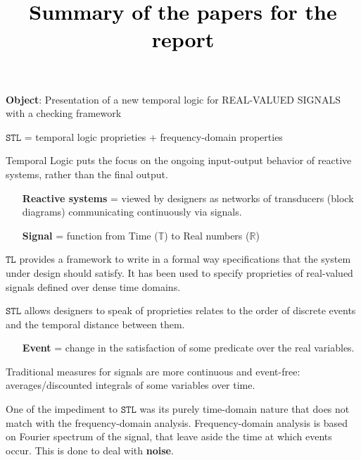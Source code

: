 \documentclass{suftesi}
\title{\textcolor{black}{Summary of the papers for the report}}
\author{}
\date{}
\renewcommand{\b}{\textbf}
\newcommand{\STL}{$\mathtt{STL}$ }
\newcommand{\TL}{$\mathtt{TL}$ }
\begin{document}
\maketitle

\tableofcontents
\newpage
\setcounter{page}{1}

\chapter{}

\b{Object}: Presentation of a new temporal logic for REAL-VALUED SIGNALS with a checking framework 

\STL = temporal logic proprieties + frequency-domain properties

Temporal Logic puts the focus on the ongoing input-output behavior of reactive systems, rather than the final output.

\begin{itemize}[leftmargin=3cm]
    \item [\b{Reactive systems} =] viewed by designers as networks of transducers (block diagrams) communicating continuously via signals.
\end{itemize}
\begin{itemize} [leftmargin=1.35cm]
    \item [\b{Signal} =] function from Time ($\mathbb{T}$) to Real numbers ($\mathbb{R}$)
\end{itemize}

\TL provides a framework to write in a formal way specifications that the system under design should satisfy. It has been used to specify proprieties of real-valued signals defined over dense time domains.

\STL allows designers to speak of proprieties relates to the order of discrete events and the temporal distance between them. 

\begin{itemize} [leftmargin=1.3cm]
    \item [\b{Event} =] change in the satisfaction of some predicate over the real variables.
\end{itemize}

Traditional measures for signals are more continuous and event-free: averages/discounted integrals of some variables over time.

One of the impediment to \STL was its purely time-domain nature that does not match with the frequency-domain analysis. Frequency-domain analysis is based on Fourier spectrum of the signal, that leave aside the time at which events occur. This is done to deal with \b{noise}.
\end{document}
